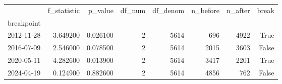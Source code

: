 \begin{tabular}{lrrrrrrr}
\toprule
 & f_statistic & p_value & df_num & df_denom & n_before & n_after & break \\
breakpoint &  &  &  &  &  &  &  \\
\midrule
2012-11-28 & 3.649200 & 0.026100 & 2 & 5614 & 696 & 4922 & True \\
2016-07-09 & 2.546000 & 0.078500 & 2 & 5614 & 2015 & 3603 & False \\
2020-05-11 & 4.282600 & 0.013900 & 2 & 5614 & 3417 & 2201 & True \\
2024-04-19 & 0.124900 & 0.882600 & 2 & 5614 & 4856 & 762 & False \\
\bottomrule
\end{tabular}
